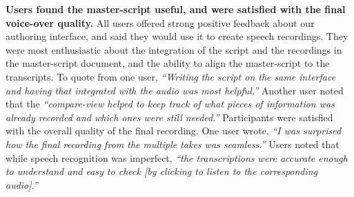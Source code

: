 \textbf{Users found the master-script useful, and were satisfied with the final voice-over quality.} All users offered strong positive feedback about our authoring
interface, and said they would use it to create speech recordings. They were most enthusiastic about the integration
of the script and the recordings in the master-script document,
and the ability to align the master-script to the transcripts.
To quote from one user, \textit{``Writing the script on the same interface and having
that integrated with the audio was most helpful.''}  Another user noted
that the \textit{``compare-view helped to keep track of what pieces
of information was already recorded and which ones were still
needed.''} Participants were satisfied with the overall quality
of the final recording. One user wrote, \textit{``I was surprised
how the final recording from the multiple takes was seamless.''} Users noted that while speech recognition was imperfect, \textit{``the transcriptions were accurate enough to understand and easy to check [by clicking to listen to the corresponding audio].''}

